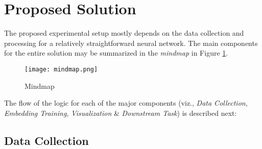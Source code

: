 \section{Proposed Solution}
    The proposed experimental setup\cite{gene2vecOFCLimpl}\cite{gene2vecimpl} mostly depends on the data collection and processing for a relatively straightforward neural network. The main components for the entire solution may be summarized in the \textit{mindmap} in Figure \ref{fig:mindmap}.
    \begin{figure}
        \centering
        \texttt{[image: mindmap.png]}
        \caption{Mindmap}
        \label{fig:mindmap}
    \end{figure}

    The flow of the logic for each of the major components (viz., \textit{Data Collection}, \textit{Embedding Training}, \textit{Visualization} \& \textit{Downstream Task}) is described next:

    \subsection{Data Collection}

